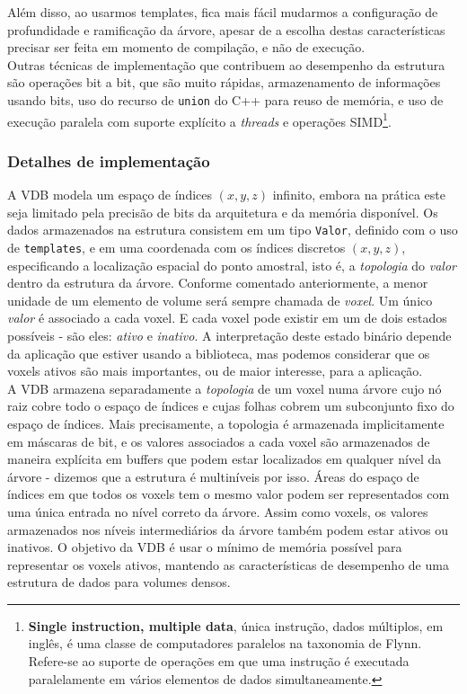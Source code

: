 \documentclass[12pt, a4paper, oneside]{book}
\begin{document}
Além disso, ao usarmos templates, fica mais fácil mudarmos a configuração de profundidade e ramificação da árvore, apesar de a escolha destas características precisar ser feita em momento de compilação, e não de execução. \\

Outras técnicas de implementação que contribuem ao desempenho da estrutura são operações bit a bit, que são muito rápidas, armazenamento de informações usando bits, uso do recurso de \texttt{union} do C++ para reuso de memória, e uso de execução paralela com suporte explícito a {\it threads} e operações SIMD\footnote{{\bf Single instruction, multiple data}, única instrução, dados múltiplos, em inglês, é uma classe de computadores paralelos na taxonomia de Flynn. Refere-se ao suporte de operações em que uma instrução é executada paralelamente em vários elementos de dados simultaneamente.}.

\subsubsection{Detalhes de implementação}
A VDB modela um espaço de índices $(x, y, z)$ infinito, embora na prática este seja limitado pela precisão de bits da arquitetura e da memória disponível. Os dados armazenados na estrutura consistem em um tipo \texttt{Valor}, definido com o uso de \texttt{templates}, e em uma coordenada com os índices discretos $(x, y, z)$, especificando a localização espacial do ponto amostral, isto é, a {\it topologia} do {\it valor} dentro da estrutura da árvore. Conforme comentado anteriormente, a menor unidade de um elemento de volume será sempre chamada de {\it voxel}. Um único {\it valor} é associado a cada voxel. E cada voxel pode existir em um de dois estados possíveis - são eles: {\it ativo} e {\it inativo}. A interpretação deste estado binário depende da aplicação que estiver usando a biblioteca, mas podemos considerar que os voxels ativos são mais importantes, ou de maior interesse, para a aplicação. \\

A VDB armazena separadamente a {\it topologia} de um voxel numa árvore cujo nó raiz cobre todo o espaço de índices e cujas folhas cobrem um subconjunto fixo do espaço de índices. Mais precisamente, a topologia é armazenada implicitamente em máscaras de bit, e os valores associados a cada voxel são armazenados de maneira explícita em buffers que podem estar localizados em qualquer nível da árvore - dizemos que a estrutura é multiníveis por isso. Áreas do espaço de índices em que todos os voxels tem o mesmo valor podem ser representados com uma única entrada no nível correto da árvore. Assim como voxels, os valores armazenados nos níveis intermediários da árvore também podem estar ativos ou inativos. O objetivo da VDB é usar o mínimo de memória possível para representar os voxels ativos, mantendo as características de desempenho de uma estrutura de dados para volumes densos. \\
\end{document}
